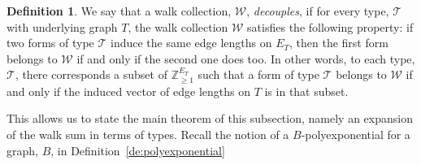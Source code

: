 \documentclass{memo-l}
\theoremstyle{plain}
\theoremstyle{definition}
\numberwithin{section}{chapter}
\numberwithin{equation}{chapter}
\theoremstyle{plain}
\theoremstyle{definition}
\newtheorem{defn}[theorem]{Definition}
\newcommand\ZZ{\mathbb{Z}}
\newcommand\cT{\mathcal{T}}
\newcommand\cW{\mathcal{W}}
\begin{document}
\begin{defn} We say that a walk collection, \( \cW \), \emph{decouples}, if
for every type, \( \cT \) with underlying graph \(T\),  the walk collection
\( \cW \) satisfies the following property: if two forms of type \( \cT \)
induce the same edge lengths on \( E_T \), then the first form belongs to
\( \cW \) if and only if the second one does too. In other words, to each
type, \( \cT \), there corresponds a subset of \( \ZZ_{\geq 1}^{E_T} \)
such that a form of type \( \cT \) belongs to \( \cW \) if and only if the
induced vector of edge lengths on \( T \) is in that subset.  \end{defn}

This allows us to state the main theorem of this subsection, namely an
expansion of the walk sum in terms of types.
Recall the notion of a $B$-polyexponential for a graph, $B$,
in Definition~\ref{de:polyexponential}
\end{document}

